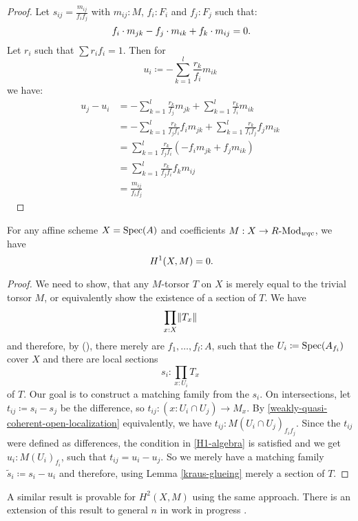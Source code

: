 \begin{proof}
  Let $s_{ij}=\frac{m_{ij}}{f_i f_j}$ with $m_{ij}:M$, $f_i:F_i$ and $f_j:F_j$ such that:
  \[ f_i\cdot m_{jk}-f_j\cdot m_{ik}+f_k\cdot m_{ij}=0 \rlap{.}\]
  Let $r_i$ such that $\sum r_i f_i =1$.
  Then for
  \[ u_i \coloneqq -\sum_{k=1}^l\frac{r_k}{f_i}m_{ik} \]
  we have:
  \begin{align*}
      u_j-u_i &= -\sum_{k=1}^l\frac{r_k}{f_j}m_{jk} + \sum_{k=1}^l\frac{r_k}{f_i}m_{ik} \\
              &= -\sum_{k=1}^l\frac{r_k}{f_j f_i}f_i m_{jk} + \sum_{k=1}^l\frac{r_k}{f_i f_j} f_j m_{ik} \\
              &= \sum_{k=1}^l\frac{r_k}{f_j f_i}(-f_i m_{jk} + f_j m_{ik}) \\
              &= \sum_{k=1}^l\frac{r_k}{f_j f_i}f_k m_{ij} \\
              &= \frac{m_{ij}}{f_i f_j}
  \end{align*}
  \ %
\end{proof}

\begin{theorem}%
  \label{H1-wqc-module-affine-trivial}
  For any affine scheme $X=\operatorname{Spec}(A)$ and coefficients $M: X\to R\text{-}\mathrm{Mod}_{wqc}$, we have
  \[ H^1(X,M)=0 \rlap{.} \]
\end{theorem}

\begin{proof}
  We need to show, that any $M$-torsor $T$ on $X$ is merely equal to the trivial torsor $M$,
  or equivalently show the existence of a section of $T$.
  We have
  \[ \prod_{x:X}\lVert  T_x  \rVert\]
  and therefore, by (),
  there merely are $f_1,\dots,f_l:A$,
  such that the $U_i\coloneqq \operatorname{Spec}(A_{f_i})$ cover $X$ and
  there are local sections
  \[ s_i:\prod_{x:U_i}T_x\]
  of $T$. Our goal is to construct a matching family from the $s_i$.
  On intersections, let $t_{ij}\coloneqq s_i-s_j$ be the difference, so $t_{ij}:(x : U_i\cap U_j) \to M_x$.
  By \cref{weakly-quasi-coherent-open-localization} equivalently,
  we have $t_{ij}:M(U_{i}\cap U_j)_{f_i f_j}$.
  Since the $t_{ij}$ were defined as differences,
  the condition in \cref{H1-algebra} is satisfied and we get
  $u_i:M(U_i)_{f_i}$, such that $t_{ij}=u_i-u_j$.
  So we merely have a matching family $\tilde{s}_i\coloneqq s_i-u_i$ and therefore, using Lemma \ref{kraus-glueing} merely a section of $T$.
\end{proof}

A similar result is provable for $H^2(X,M)$ using the same approach.
There is an extension of this result to general $n$ in work in progress \cite{chech-draft}.

